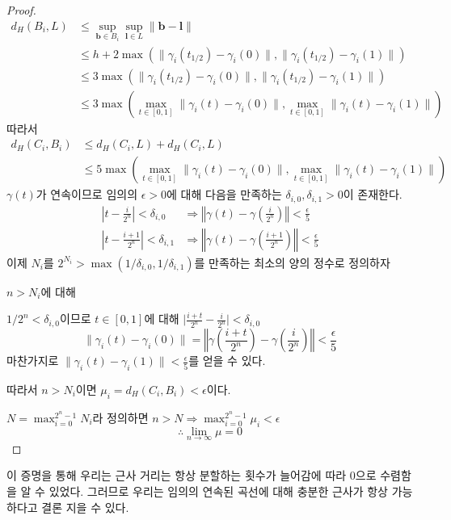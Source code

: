 \documentclass{gshs_thesis}
\theoremstyle{theorem}
\theoremstyle{lemma}
\theoremstyle{definition}
\begin{document}
\begin{proof}
\begin{equation}
	\begin{split}
		d_{H}(B_{i},L)&\leq\sup_{\textbf{b}\in{B_{i}}}\sup_{\textbf{l}\in{L}}\parallel\textbf{b}-\textbf{l}\parallel \\
		&\leq{h+2\max\left(\parallel\gamma_{i}(t_{1/2})-\gamma_{i}(0)\parallel,\parallel\gamma_{i}(t_{1/2})-\gamma_{i}(1)\parallel\right)} \\
		&\leq{3\max\left(\parallel\gamma_{i}(t_{1/2})-\gamma_{i}(0)\parallel,\parallel\gamma_{i}(t_{1/2})-\gamma_{i}(1)\parallel\right)} \\
		&\leq{3\max\left(\max_{t\in{[0,1]}}\parallel\gamma_{i}(t)-\gamma_{i}(0)\parallel,\max_{t\in{[0,1]}}\parallel\gamma_{i}(t)-\gamma_{i}(1)\parallel\right)}
	\end{split}
\end{equation}
따라서
\begin{equation}
	\begin{split}
		d_{H}(C_{i},B_{i})&\leq{d_{H}(C_{i},L)+d_{H}(C_{i},L)} \\
		&\leq{5\max\left(\max_{t\in{[0,1]}}\parallel\gamma_{i}(t)-\gamma_{i}(0)\parallel,\max_{t\in{[0,1]}}\parallel\gamma_{i}(t)-\gamma_{i}(1)\parallel\right)}
	\end{split}
\end{equation}
$\gamma(t)$가 연속이므로 임의의 $\epsilon>0$에 대해 다음을 만족하는 $\delta_{i,0},\delta_{i,1}>0$이 존재한다.
\begin{equation}
	\begin{split}
	\left|t-\frac{i}{2^{n}}\right|<\delta_{i,0}&\Longrightarrow\left\Vert\gamma(t)-\gamma\left(\frac{i}{2^{n}}\right)\right\Vert<\frac{\epsilon}{5} \\
	\left|t-\frac{i+1}{2^{n}}\right|<\delta_{i,1}&\Longrightarrow\left\Vert\gamma(t)-\gamma(\frac{i+1}{2^{n}})\right\Vert<\frac{\epsilon}{5}
	\end{split}
\end{equation}
이제 $N_{i}$를 $2^{N_{i}}>\max(1/\delta_{i,0},1/\delta_{i,1})$를 만족하는 최소의 양의 정수로 정의하자

$n>N_{i}$에 대해

$1/2^{n}<\delta_{i,0}$이므로 $t\in{[0,1]}$에 대해 $\mid\frac{i+t}{2^{n}}-\frac{i}{2^{n}}\mid<\delta_{i,0}$
\begin{equation}
     \parallel\gamma_{i}(t)-\gamma_{i}(0)\parallel=\left\Vert\gamma\left(\frac{i+t}{2^{n}}\right)-\gamma\left(\frac{i}{2^{n}}\right)\right\Vert<\frac{\epsilon}{5}
\end{equation}
마찬가지로 $\parallel\gamma_{i}(t)-\gamma_{i}(1)\parallel<\frac{\epsilon}{5}$를 얻을 수 있다.

따라서 $n>N_{i}$이면 $\mu_{i}=d_{H}(C_{i},B_{i})<\epsilon$이다. 

$N=\max^{2^{n}-1}_{i=0}N_{i}$라 정의하면 $n>N \Longrightarrow{}\max^{2^{n}-1}_{i=0}\mu_{i}<\epsilon$
\begin{equation}
	\therefore\lim_{n \to \infty}\mu=0
\end{equation}
\end{proof}
이 증명을 통해 우리는 근사 거리는 항상 분할하는 횟수가 늘어감에 따라 0으로 수렴함을 알 수 있었다. 그러므로 우리는 임의의 연속된 곡선에 대해 충분한 근사가 항상 가능하다고 결론 지을 수 있다.
\end{document}
